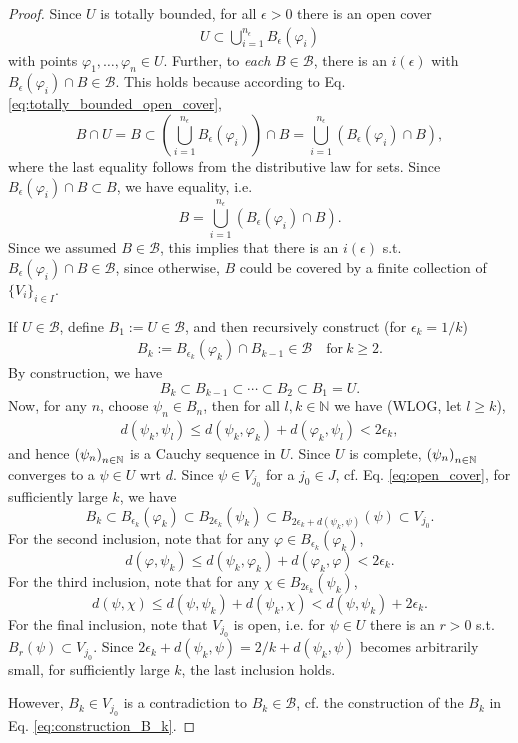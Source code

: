 \begin{proof}
	Since $U$ is totally bounded, for all $\epsilon > 0$ there is an open cover
	\begin{align}\label{eq:totally_bounded_open_cover}
		U\subset \bigcup_{i=1}^{n_{\epsilon}}B_{\epsilon}(\varphi_i)
	\end{align}
	with points $\varphi_1, \dots, \varphi_n\in U$. Further, to \textit{each} $B\in\mathcal B$, there is an $i(\epsilon)$ with $B_{\epsilon}(\varphi_i)\cap B\in\mathcal B$. This holds because according to Eq. \eqref{eq:totally_bounded_open_cover}, $$B\cap U = B \subset \left(\bigcup_{i=1}^{n_{\epsilon}}B_{\epsilon}(\varphi_i)\right) \cap B = \bigcup_{i=1}^{n_{\epsilon}}\left(B_{\epsilon}(\varphi_i) \cap B\right),$$ where the last equality follows from the distributive law for sets. Since $B_{\epsilon}(\varphi_i) \cap B \subset B$, we have equality, i.e. $$B = \bigcup_{i=1}^{n_{\epsilon}}\left(B_{\epsilon}(\varphi_i) \cap B\right).$$ Since we assumed $B\in\mathcal B$, this implies that there is an $i(\epsilon)$ s.t. $B_{\epsilon}(\varphi_i)\cap B\in \mathcal B$, since otherwise, $B$ could be covered by a finite collection of $\{V_i\}_{i\in I}$.
	
	If $U\in\mathcal B$, define $B_1 := U\in\mathcal B$, and then recursively construct (for $\epsilon_k = 1/k$)
	\begin{align}\label{eq:construction_B_k}
		B_k := B_{\epsilon_k}(\varphi_k) \cap B_{k - 1}\in\mathcal B\quad\text{for}\ k\geq 2.
	\end{align}
	By construction, we have
	$$B_{k} \subset B_{k - 1}\subset \cdots\subset B_2\subset B_1 = U.$$
	Now, for any $n$, choose $\psi_n\in B_n$, then for all $l, k\in\mathbb N$ we have (WLOG, let $l\geq k$),
	\begin{align}
		d(\psi_k, \psi_l) \leq d(\psi_k, \varphi_k) + d(\varphi_k, \psi_l) < 2\epsilon_k,
	\end{align}
	and hence $\seq[\psi_n]$ is a Cauchy sequence in $U$. Since $U$ is complete, $\seq[\psi_n]$ converges to a $\psi\in U$ wrt $d$. Since $\psi\in V_{j_0}$ for a $j_{0}\in J$, cf. Eq. \eqref{eq:open_cover}, for sufficiently large $k$, we have
	$$B_k\subset B_{\epsilon_k}(\varphi_k) \subset B_{2\epsilon_k}(\psi_k) \subset B_{2\epsilon_k + d(\psi_k, \psi)}(\psi) \subset V_{j_0}.$$
	For the second inclusion, note that for any $\varphi\in B_{\epsilon_k}(\varphi_k)$, $$d(\varphi, \psi_k) \leq d(\psi_k, \varphi_k) + d(\varphi_k, \varphi) < 2\epsilon_k.$$
	For the third inclusion, note that for any $\chi\in B_{2\epsilon_k}(\psi_k)$, $$d(\psi, \chi) \leq d(\psi, \psi_k) + d(\psi_k, \chi) < d(\psi, \psi_k) + 2\epsilon_k.$$
	For the final inclusion, note that $V_{j_0}$ is open, i.e. for $\psi\in U$ there is an $r > 0$ s.t. $B_{r}(\psi) \subset V_{j_0}$. Since $2\epsilon_k + d(\psi_k, \psi) = 2/k + d(\psi_k, \psi)$ becomes arbitrarily small, for sufficiently large $k$, the last inclusion holds.
	
	However, $B_k\in V_{j_0}$ is a contradiction to $B_k\in\mathcal B$, cf. the construction of the $B_k$ in Eq. \eqref{eq:construction_B_k}.	
\end{proof}

